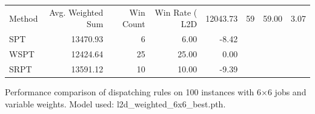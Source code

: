 \begin{tabular}{lrrrr}
\toprule
Method & Avg. Weighted Sum & Win Count & Win Rate (%
\midrule
L2D & 12043.73 & 59 & 59.00 & 3.07 \\
SPT & 13470.93 & 6 & 6.00 & -8.42 \\
WSPT & 12424.64 & 25 & 25.00 & 0.00 \\
SRPT & 13591.12 & 10 & 10.00 & -9.39 \\
\bottomrule
\end{tabular}
\caption{Performance comparison of dispatching rules on 100 instances with 6×6 jobs and variable weights. Model used: l2d_weighted_6x6_best.pth.}
